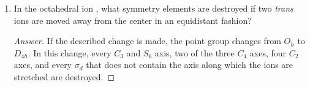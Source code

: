 \documentclass[../psets.tex]{subfiles}
\begin{document}
\begin{enumerate}[label={\Roman*)}]
    \newpage
    \item In the octahedral ion , what symmetry elements are destroyed if two \emph{trans}  ions are moved away from the  center in an equidistant fashion?
    \begin{proof}[Answer]
        If the described change is made, the point group changes from $O_h$ to $D_{4h}$. In this change, every $C_3$ and $S_6$ axis, two of the three $C_4$ axes, four $C_2$ axes, and every $\sigma_d$ that does not contain the axis along which the  ions are stretched are destroyed.
    \end{proof}
\end{enumerate}
\end{document}
